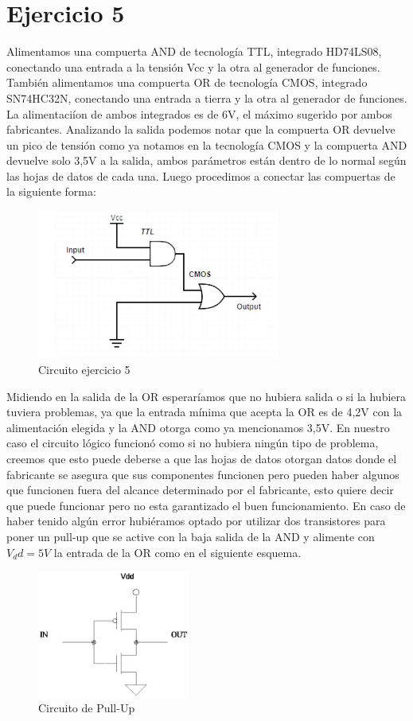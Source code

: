 \part*{Ejercicio 5}
Alimentamos una compuerta AND de tecnolog\'ia TTL, integrado HD74LS08, conectando una entrada a la tensi\'on Vcc y la otra al generador de funciones. Tambi\'en alimentamos una compuerta OR de tecnolog\'ia CMOS, integrado SN74HC32N, conectando una entrada a tierra y la otra al generador de funciones. La alimentaci\'ion de ambos integrados es de 6V, el m\'aximo sugerido por ambos fabricantes. Analizando la salida podemos notar que la compuerta OR devuelve un pico de tensi\'on como ya notamos en la tecnolog\'ia CMOS y la compuerta AND devuelve solo 3,5V a la salida, ambos par\'ametros est\'an dentro de lo normal seg\'un las hojas de datos de cada una. Luego procedimos a conectar las compuertas de la siguiente forma:

\begin{figure}[hbtp]
\centering
\includegraphics[width=8cm]{ejercicio5/E3_CirEj5.jpg}  
\caption{Circuito ejercicio 5}
\end{figure}


Midiendo en la salida de la OR esperar\'iamos que no hubiera salida o si la hubiera tuviera problemas, ya que la entrada m\'inima que acepta la OR es de 4,2V con la alimentaci\'on elegida y la AND otorga como ya mencionamos 3,5V. En nuestro caso el circuito l\'ogico funcion\'o como si no hubiera ning\'un tipo de problema, creemos que esto puede deberse a que las hojas de datos otorgan datos donde el fabricante se asegura que sus componentes funcionen pero pueden haber algunos que funcionen fuera del alcance determinado por el fabricante, esto quiere decir que puede funcionar pero no esta garantizado el buen funcionamiento. En caso de haber tenido alg\'un error hubi\'eramos optado por utilizar dos transistores para poner un pull-up que se active con la baja salida de la AND y alimente con $V_dd=5V$ la entrada de la OR como en el siguiente esquema.

\begin{figure}[hbtp]
\centering
\includegraphics[width=5cm]{ejercicio5/PullUp.jpg} 
\caption{Circuito de Pull-Up}
\end{figure}

